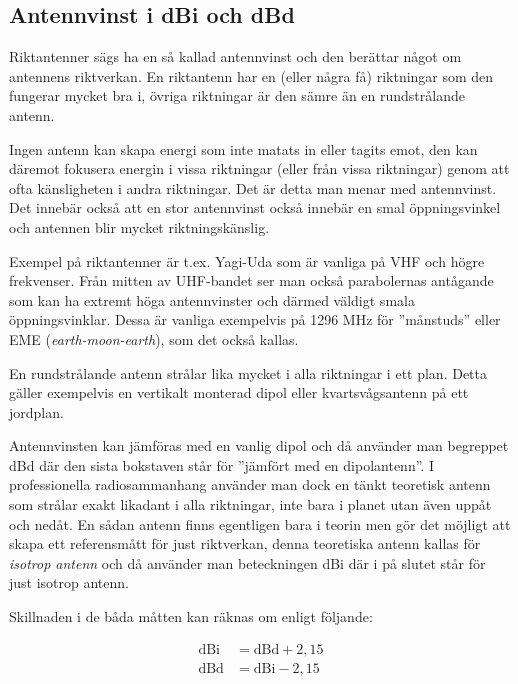 \subsection{Antennvinst i dBi och dBd}

Riktantenner sägs ha en så kallad antennvinst och den berättar något om
antennens riktverkan. En riktantenn har en (eller några få) riktningar som den
fungerar mycket bra i, övriga riktningar är den sämre än en rundstrålande
antenn.

Ingen antenn kan skapa energi som inte matats in eller tagits emot, den kan
däremot fokusera energin i vissa riktningar (eller från vissa riktningar)
genom att ofta känsligheten i andra riktningar. Det är detta man menar med
antennvinst. Det innebär också att en stor antennvinst också innebär en smal
öppningsvinkel och antennen blir mycket riktningskänslig.

Exempel på riktantenner är t.ex. Yagi-Uda som är vanliga på VHF och högre
frekvenser. Från mitten av UHF-bandet ser man också parabolernas antågande som
kan ha extremt höga antennvinster och därmed väldigt smala
öppningsvinklar. Dessa är vanliga exempelvis på 1296 MHz för ''månstuds''
eller EME ({\it earth-moon-earth}), som det också kallas.

En rundstrålande antenn strålar lika mycket i alla riktningar i ett plan.
Detta gäller exempelvis en vertikalt monterad dipol eller kvartsvågsantenn på
ett jordplan.

Antennvinsten kan jämföras med en vanlig dipol och då använder man begreppet
dBd där den sista bokstaven står för ''jämfört med en dipolantenn''. I
professionella radiosammanhang använder man dock en tänkt teoretisk antenn som
strålar exakt likadant i alla riktningar, inte bara i planet utan även uppåt
och nedåt. En sådan antenn finns egentligen bara i teorin men gör det möjligt
att skapa ett referensmått för just riktverkan, denna teoretiska antenn kallas
för {\it isotrop antenn} och då använder man beteckningen dBi där i på slutet står
för just isotrop antenn.

Skillnaden i de båda måtten kan räknas om enligt följande:

\begin{align}
\text{dBi} &= \text{dBd} + 2,15\\
\text{dBd} &= \text{dBi} - 2,15
\end{align}

